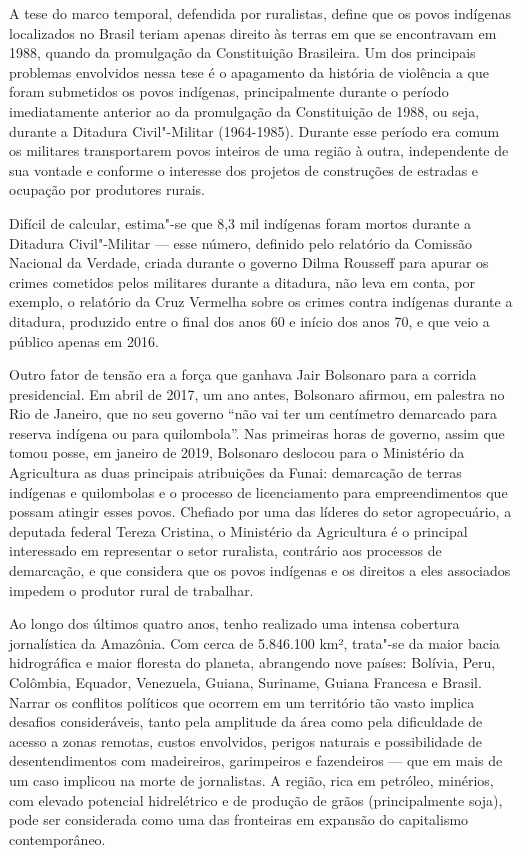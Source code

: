 A tese do marco temporal, defendida por ruralistas, define que os povos
indígenas localizados no Brasil teriam apenas direito às terras em que
se encontravam em 1988, quando da promulgação da Constituição
Brasileira. Um dos principais problemas envolvidos nessa tese é o
apagamento da história de violência a que foram submetidos os povos
indígenas, principalmente durante o período imediatamente anterior ao da
promulgação da Constituição de 1988, ou seja, durante a Ditadura Civil"-Militar
(1964-1985). Durante esse período era comum os militares transportarem povos inteiros
de uma região à outra, independente de sua vontade e conforme o
interesse dos projetos de construções de estradas e ocupação por
produtores rurais.

Difícil de calcular, estima"-se que 8,3 mil indígenas foram mortos
durante a Ditadura Civil"-Militar --- esse número, definido pelo relatório da
Comissão Nacional da Verdade, criada durante o governo Dilma Rousseff
para apurar os crimes cometidos pelos militares durante a ditadura, não
leva em conta, por exemplo, o relatório da Cruz Vermelha sobre os crimes
contra indígenas durante a ditadura, produzido entre o final dos anos 60
e início dos anos 70, e que veio a público apenas em 2016.

Outro fator de tensão era a força que ganhava Jair Bolsonaro para a
corrida presidencial. Em abril de 2017, um ano antes, Bolsonaro afirmou,
em palestra no Rio de Janeiro, que no seu governo ``não vai ter um
centímetro demarcado para reserva indígena ou para quilombola''. Nas
primeiras horas de governo, assim que tomou posse, em janeiro de 2019,
Bolsonaro deslocou para o Ministério da Agricultura as duas principais
atribuições da Funai: demarcação de terras indígenas e quilombolas e o
processo de licenciamento para empreendimentos que possam atingir esses
povos. Chefiado por uma das líderes do setor agropecuário, a deputada
federal Tereza Cristina, o Ministério da Agricultura é o principal
interessado em representar o setor ruralista, contrário aos processos
de demarcação, e que considera que os povos indígenas e os direitos a
eles associados impedem o produtor rural de trabalhar.

\asterisc

Ao longo dos últimos quatro anos, tenho realizado uma intensa cobertura
jornalística da Amazônia. Com cerca de 5.846.100 km², trata"-se da maior
bacia hidrográfica e maior floresta do planeta, abrangendo nove países:
Bolívia, Peru, Colômbia, Equador, Venezuela, Guiana, Suriname, Guiana
Francesa e Brasil. Narrar os conflitos políticos que ocorrem em um
território tão vasto implica desafios consideráveis, tanto pela
amplitude da área como pela dificuldade de acesso a zonas remotas,
custos envolvidos, perigos naturais e possibilidade de desentendimentos
com madeireiros, garimpeiros e fazendeiros --- que em mais de um caso
implicou na morte de jornalistas. A região, rica em petróleo, minérios,
com elevado potencial hidrelétrico e de produção de grãos
(principalmente soja), pode ser considerada como uma das fronteiras em
expansão do capitalismo contemporâneo.

